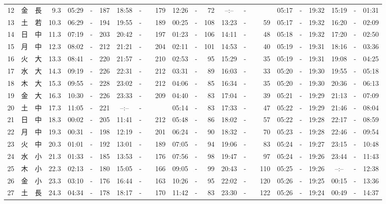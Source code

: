 \documentclass[12pt,a4j]{jsarticle}
\begin{document}
\begin{table}[htbp]
\begin{center}
\begin{tabularx}{10cm}{|rc|cr|ccrccr|ccrccr|ccc|ccc|}
12 & 金 & 長 &  9.3 &  05:29 &-& 187 &  18:58 &-& 179 &  12:26 &-&  72 &  --:-- &-&~~~~~ & 05:17 & -& 19:32 & 15:19 & -& 01:31 \\
13 & 土 & 若 & 10.3 &  06:29 &-& 194 &  19:55 &-& 189 &  00:25 &-& 108 &  13:23 &-&  59 & 05:17 & -& 19:32 & 16:20 & -& 02:09 \\
14 & 日 & 中 & 11.3 &  07:19 &-& 203 &  20:42 &-& 197 &  01:23 &-& 106 &  14:11 &-&  48 & 05:18 & -& 19:32 & 17:20 & -& 02:50 \\
15 & 月 & 中 & 12.3 &  08:02 &-& 212 &  21:21 &-& 204 &  02:11 &-& 101 &  14:53 &-&  40 & 05:19 & -& 19:31 & 18:16 & -& 03:36 \\
16 & 火 & 大 & 13.3 &  08:41 &-& 220 &  21:57 &-& 210 &  02:53 &-&  95 &  15:29 &-&  35 & 05:19 & -& 19:31 & 19:08 & -& 04:25 \\
17 & 水 & 大 & 14.3 &  09:19 &-& 226 &  22:31 &-& 212 &  03:31 &-&  89 &  16:03 &-&  33 & 05:20 & -& 19:30 & 19:55 & -& 05:18 \\
18 & 木 & 大 & 15.3 &  09:55 &-& 228 &  23:02 &-& 212 &  04:06 &-&  85 &  16:34 &-&  35 & 05:20 & -& 19:30 & 20:36 & -& 06:13 \\
19 & 金 & 大 & 16.3 &  10:30 &-& 226 &  23:33 &-& 209 &  04:40 &-&  83 &  17:04 &-&  39 & 05:21 & -& 19:29 & 21:13 & -& 07:09 \\
20 & 土 & 中 & 17.3 &  11:05 &-& 221 &  --:-- &-&~~~~~ &  05:14 &-&  83 &  17:33 &-&  47 & 05:22 & -& 19:29 & 21:46 & -& 08:04 \\
21 & 日 & 中 & 18.3 &  00:02 &-& 205 &  11:41 &-& 212 &  05:48 &-&  86 &  18:02 &-&  57 & 05:22 & -& 19:28 & 22:17 & -& 08:59 \\
22 & 月 & 中 & 19.3 &  00:31 &-& 198 &  12:19 &-& 201 &  06:24 &-&  90 &  18:32 &-&  70 & 05:23 & -& 19:28 & 22:46 & -& 09:54 \\
23 & 火 & 中 & 20.3 &  01:01 &-& 192 &  13:01 &-& 189 &  07:05 &-&  94 &  19:06 &-&  83 & 05:24 & -& 19:27 & 23:15 & -& 10:48 \\
24 & 水 & 小 & 21.3 &  01:33 &-& 185 &  13:53 &-& 176 &  07:56 &-&  98 &  19:47 &-&  97 & 05:24 & -& 19:26 & 23:44 & -& 11:43 \\
25 & 木 & 小 & 22.3 &  02:13 &-& 180 &  15:05 &-& 166 &  09:05 &-&  99 &  20:43 &-& 110 & 05:25 & -& 19:26 & --:-- & -& 12:38 \\
26 & 金 & 小 & 23.3 &  03:10 &-& 176 &  16:44 &-& 163 &  10:26 &-&  95 &  22:02 &-& 120 & 05:26 & -& 19:25 & 00:15 & -& 13:36 \\
27 & 土 & 長 & 24.3 &  04:34 &-& 178 &  18:17 &-& 170 &  11:42 &-&  83 &  23:30 &-& 122 & 05:26 & -& 19:24 & 00:49 & -& 14:37 \\

\end{tabularx}
\end{center}
\end{table}
\end{document}
